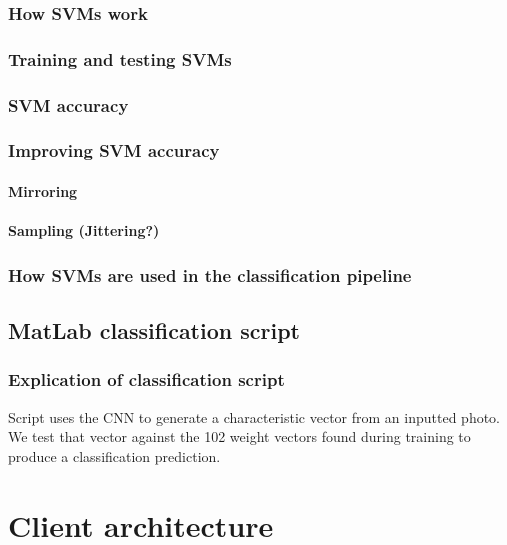 \documentclass[11pt, a4paper]{report}
\begin{document}
\subsection{How SVMs work}

\subsection{Training and testing SVMs}

\subsection{SVM accuracy}

\subsection{Improving SVM accuracy}

\subsubsection{Mirroring}

\subsubsection{Sampling (Jittering?)}

\subsection{How SVMs are used in the classification pipeline}

\section{MatLab classification script}

\subsection{Explication of classification script}
Script uses the CNN to generate a characteristic vector from an inputted photo. We test that vector against the 102 weight vectors found during training to produce a classification prediction.





\chapter{Client architecture}
\end{document}
